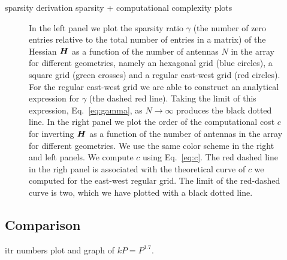 \documentclass[useAMS,usenatbib]{mn2e}
\newcommand{\bH}{\bmath{H}}
\begin{document}
sparsity derivation
sparsity + computational complexity plots
\begin{figure}
\centering
{}
\caption{In the left panel we plot the sparsity ratio $\gamma$ (the number of zero entries relative to the total number of entries in a matrix) of the Hessian $\bH$ as a function of the number 
of antennas $N$ in the array for different geometries, namely an hexagonal grid (blue circles), a square grid (green crosses) and a regular east-west grid (red circles). For the regular east-west grid we are able to construct an analytical expression for $\gamma$ (the dashed red line). Taking the limit 
of this expression, Eq.~\eqref{eq:gamma}, as $N\rightarrow \infty$ produces the black dotted line. In the right panel we plot the order of the computational cost $c$ for inverting $\bH$ as a function of the number 
of antennas in the array for different geometries. We use the same color scheme in the right and left panels. We compute $c$ using Eq.~\eqref{eq:c}. The red dashed line 
in the righ panel is associated with the theoretical curve of $c$ we computed for the east-west regular grid. The limit of the red-dashed curve is two, which we 
have plotted with a black dotted line.
\label{fig:sup_anti}} 
\end{figure}


\subsection{Comparison}
itr numbers plot and graph of $kP = P^{1.7}$.
\end{document}
